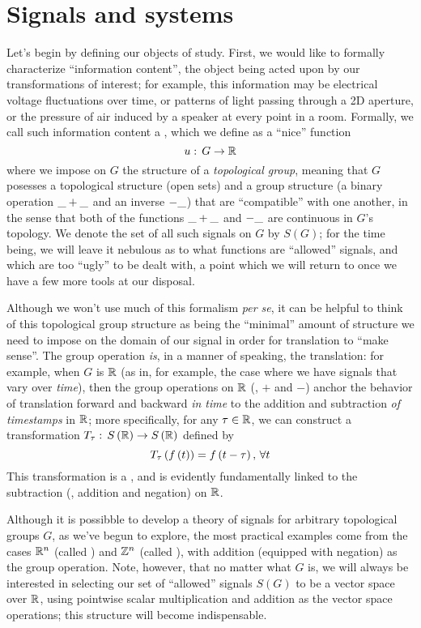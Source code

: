 \section{Signals and systems}

Let's begin by defining our objects of study. First, we would like to formally characterize ``information content'', the object being acted upon by our transformations of interest; for example, this information may be electrical voltage fluctuations over time, or patterns of light passing through a 2D aperture, or the pressure of air induced by a speaker at every point in a room. Formally, we call such information content a , which we define as a ``nice'' function
\[ u: \, G \to \mathbb{R} \]
where we impose on $G$ the structure of a \emph{topological group}, meaning that $G$ posesses a topological structure (open sets) and a group structure (a binary operation $\_ + \_$ and an inverse $- \_$) that are ``compatible'' with one another, in the sense that both of the functions $\_ + \_$ and $- \_$ are continuous in $G$'s topology. We denote the set of all such signals on $G$ by $S(G)$; for the time being, we will leave it nebulous as to what functions are ``allowed'' signals, and which are too ``ugly'' to be dealt with, a point which we will return to once we have a few more tools at our disposal.

Although we won't use much of this formalism \emph{per se}, it can be helpful to think of this topological group structure as being the ``minimal'' amount of structure we need to impose on the domain of our signal in order for translation to ``make sense''. The group operation \emph{is}, in a manner of speaking, the translation: for example, when $G$ is $\mathbb{R}$ (as in, for example, the case where we have signals that vary over \emph{time}), then the group operations on $\mathbb{R}$ (\ie, $+$ and $-$) anchor the behavior of translation forward and backward \emph{in time} to the addition and subtraction \emph{of timestamps} in $\mathbb{R}$; more specifically, for any $\tau \in \mathbb{R}$, we can construct a transformation $T_\tau: \, S\left( \mathbb{R} \right) \to S\left( \mathbb{R} \right)$ defined by
\[ T_\tau\left( f\left( t \right) \right) = f\left( t - \tau \right),\,\forall t \]
This transformation is a , and is evidently fundamentally linked to the subtraction (\ie, addition and negation) on $\mathbb{R}$.

Although it is possibble to develop a theory of signals for arbitrary topological groups $G$, as we've begun to explore, the most practical examples come from the cases $\mathbb{R}^n$ (called ) and $\mathbb{Z}^n$ (called ), with addition (equipped with negation) as the group operation. Note, however, that no matter what $G$ is, we will always be interested in selecting our set of ``allowed'' signals $S(G)$ to be a vector space over $\mathbb{R}$, using pointwise scalar multiplication and addition as the vector space operations; this structure will become indispensable.

